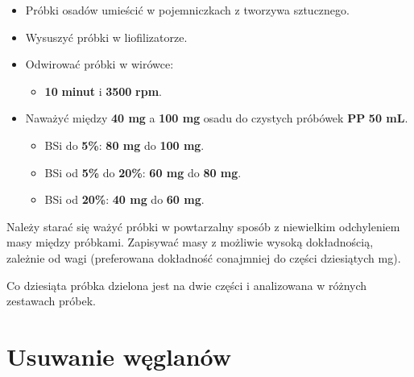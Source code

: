 \documentclass[
  letterpaper,
  DIV=11,
  numbers=noendperiod]{scrreprt}
\providecommand{\tightlist}{%
  \setlength{\itemsep}{0pt}\setlength{\parskip}{0pt}}\usepackage{longtable,booktabs,array}
\begin{document}
\begin{itemize}
\tightlist
\item
  Próbki osadów umieścić w pojemniczkach z tworzywa sztucznego.
\item
  Wysuszyć próbki w liofilizatorze.
\item
  Odwirować próbki w wirówce:

  \begin{itemize}
  \tightlist
  \item
    \textbf{10} \textbf{minut} i \textbf{3500} \textbf{rpm}.
  \end{itemize}
\item
  Naważyć między \textbf{40 mg} a \textbf{100 mg} osadu do czystych
  próbówek \textbf{PP} \textbf{50 mL}.

  \begin{itemize}
  \item
    BSi do \textbf{5\%}: \textbf{80 mg} do \textbf{100 mg}.
  \item
    BSi od \textbf{5\%} do \textbf{20\%}: \textbf{60 mg} do \textbf{80
    mg}.
  \item
    BSi od \textbf{20\%}: \textbf{40 mg} do \textbf{60 mg}.
  \end{itemize}
\end{itemize}

\begin{tcolorbox}[enhanced jigsaw, toptitle=1mm, bottomtitle=1mm, opacitybacktitle=0.6, colframe=quarto-callout-tip-color-frame, bottomrule=.15mm, title=\textcolor{quarto-callout-tip-color}{\faLightbulb}\hspace{0.5em}{Uwaga}, colbacktitle=quarto-callout-tip-color!10!white, left=2mm, breakable, rightrule=.15mm, colback=white, opacityback=0, arc=.35mm, coltitle=black, leftrule=.75mm, toprule=.15mm, titlerule=0mm]

Należy starać się ważyć próbki w powtarzalny sposób z niewielkim
odchyleniem masy między próbkami. Zapisywać masy z możliwie wysoką
dokładnością, zależnie od wagi (preferowana dokładność conajmniej do
części dziesiątych mg).

Co dziesiąta próbka dzielona jest na dwie części i analizowana w różnych
zestawach próbek.

\end{tcolorbox}

\hypertarget{usuwanie-wux119glanuxf3w}{%
\section{Usuwanie węglanów}\label{usuwanie-wux119glanuxf3w}}
\end{document}
